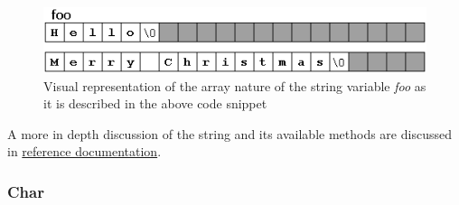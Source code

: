 \begin{figure}[h]
    \includegraphics[width=\textwidth]{string_as_array.png}
    \caption{Visual representation of the array nature of the string variable \textit{foo} as it is described in the above code snippet}
\end{figure}

A more in depth discussion of the string and its available methods are discussed in \href{https://cplusplus.com/reference/string/string/}{reference documentation}.

\subsubsection{Char}



